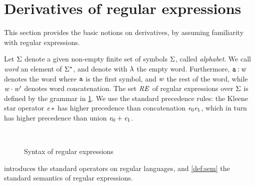 \section{Derivatives of regular expressions}\label{sec:der}

This section provides the basic notions on derivatives, by assuming familiarity with regular expressions.

Let $\Sigma$ denote a given non-empty finite set of symbols $\Sigma$, called \emph{alphabet}. We call \emph{word} an element of $\Sigma^*$, and denote with $\lambda$ the empty word. Furthermore, $\mathtt {a}\mathbin{:}\mathit {w}$ denotes the word where $\mathtt {a}$ is the first symbol, and $\mathit {w}$ the rest of the word, while $\mathit {w}\mathbin{\cdot}\mathit {w}'$ denotes word concatenation.
The set $\mathit {RE}$ of regular expressions over $\Sigma$ is defined by the grammar in \cref{fig:syn}. We use the standard precedence rules: the Kleene star operator ${{\mathit {e}}\mathop{*}}$  has higher precedence than concatenation $\mathit {e}_0\mathit {e}_1$, which in turn has higher precedence than union $\mathit {e}_0\mathbin{+}\mathit {e}_1$.
\begin{figure}[h]
 \begin{small}
  \begin{center}
   \begin{grammar}
     \\
   \end{grammar}
  \end{center}
 \end{small}
 \caption{Syntax of regular expressions}
 \label{fig:syn}
\end{figure}

 introduces the standard operators on regular languages, and \cref{def:sem} the standard semantics of regular expressions.

\begin{definition}\label[definition]{def:sem}
 \[
  \begin{array}{l}
   \sem{\none}=\emptyset\quad \sem{\eps}=\{\emptyWord\} \quad \sem{\sym}=\{\sym\} \quad
   \sem{\re_0\catop\re_1}=\sem{\re_0}\strcatop\sem{\re_1} \quad \sem{\re_0\orop\re_1}=\sem{\re_0}\cup\sem{\re_1} \quad \sem{\starop{\re_0}}=\starop{\sem{\re_0}}
  \end{array}
 \]
\end{definition}

